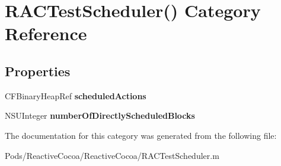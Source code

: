 \hypertarget{category_r_a_c_test_scheduler_07_08}{}\section{R\+A\+C\+Test\+Scheduler() Category Reference}
\label{category_r_a_c_test_scheduler_07_08}
\subsection*{Properties}
\begin{DoxyCompactItemize}
\item 
\mbox{\label{category_r_a_c_test_scheduler_07_08_aff5f8e4d3d68b06e85111bfba4e60841}} 
C\+F\+Binary\+Heap\+Ref {\bfseries scheduled\+Actions}
\item 
\mbox{\label{category_r_a_c_test_scheduler_07_08_a78aa4143a4b33186bccc6b2bc77bdd2d}} 
N\+S\+U\+Integer {\bfseries number\+Of\+Directly\+Scheduled\+Blocks}
\end{DoxyCompactItemize}


The documentation for this category was generated from the following file\+:\begin{DoxyCompactItemize}
\item 
Pods/\+Reactive\+Cocoa/\+Reactive\+Cocoa/R\+A\+C\+Test\+Scheduler.\+m\end{DoxyCompactItemize}
